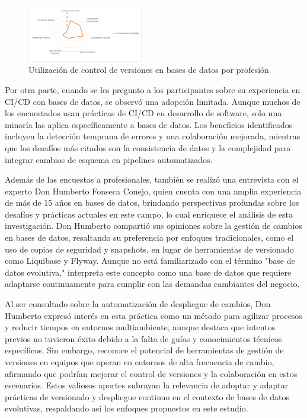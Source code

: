\documentclass{IEEEtran}
\begin{document}
\begin{figure}[H]
    \centering
    \includegraphics[width=0.45\textwidth]{images/dificultades.png}
    \caption{Utilización de control de versiones en bases de datos por profesión}
    \label{fig:dificultades}
\end{figure}

Por otra parte, cuando se les pregunto a los participantes sobre su experiencia en CI/CD con bases de datos, se observó una adopción limitada. Aunque muchos de los encuestados usan prácticas de CI/CD en desarrollo de software, solo una minoría las aplica específicamente a bases de datos. Los beneficios identificados incluyen la detección temprana de errores y una colaboración mejorada, mientras que los desafíos más citados son la consistencia de datos y la complejidad para integrar cambios de esquema en pipelines automatizados.

Además de las encuestas a profesionales, también se realizó una entrevista con el experto Don Humberto Fonseca Conejo, quien cuenta con una amplia experiencia de más de 15 años en bases de datos, brindando perspectivas profundas sobre los desafíos y prácticas actuales en este campo, lo cual enriquece el análisis de esta investigación. Don Humberto compartió sus opiniones sobre la gestión de cambios en bases de datos, resaltando su preferencia por enfoques tradicionales, como el uso de copias de seguridad y snapshots, en lugar de herramientas de versionado como Liquibase y Flyway. Aunque no está familiarizado con el término "base de datos evolutiva," interpreta este concepto como una base de datos que requiere adaptarse continuamente para cumplir con las demandas cambiantes del negocio.

Al ser consultado sobre la automatización de despliegue de cambios, Don Humberto expresó interés en esta práctica como un método para agilizar procesos y reducir tiempos en entornos multiambiente, aunque destaca que intentos previos no tuvieron éxito debido a la falta de guías y conocimientos técnicos específicos. Sin embargo, reconoce el potencial de herramientas de gestión de versiones en equipos que operan en entornos de alta frecuencia de cambio, afirmando que podrían mejorar el control de versiones y la colaboración en estos escenarios. Estos valiosos aportes subrayan la relevancia de adoptar y adaptar prácticas de versionado y despliegue continuo en el contexto de bases de datos evolutivas, respaldando así los enfoques propuestos en este estudio.
\end{document}
